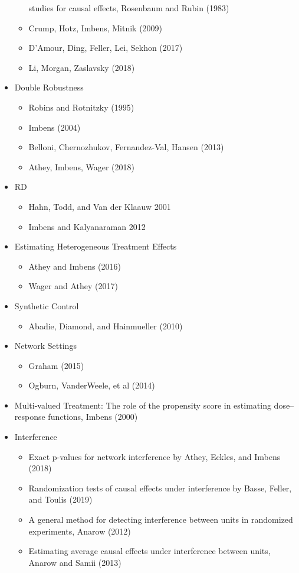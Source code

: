 \documentclass[12pt]{article}
\theoremstyle{plain}
\theoremstyle{definition}
\theoremstyle{remark}
\begin{document}
\begin{itemize}
\begin{itemize}
        studies for causal effects,
        Rosenbaum and Rubin (1983)
      \item
        Crump, Hotz, Imbens, Mitnik (2009)
      \item D'Amour, Ding, Feller, Lei, Sekhon (2017)
      \item Li, Morgan, Zaslavsky (2018)
    \end{itemize}
  \item Double Robustness
    \begin{itemize}
      \item Robins and Rotnitzky (1995)
      \item Imbens (2004)
      \item Belloni, Chernozhukov, Fernandez-Val, Hansen (2013)
      \item Athey, Imbens, Wager (2018)
    \end{itemize}
  \item RD
    \begin{itemize}
      \item Hahn, Todd, and Van der Klaauw 2001
      \item Imbens and Kalyanaraman 2012
    \end{itemize}
  \item Estimating Heterogeneous Treatment Effects
    \begin{itemize}
      \item Athey and Imbens (2016)
      \item Wager and Athey (2017)
    \end{itemize}
  \item Synthetic Control
    \begin{itemize}
      \item Abadie, Diamond, and Hainmueller (2010)
    \end{itemize}
  \item Network Settings
    \begin{itemize}
      \item Graham (2015)
      \item Ogburn, VanderWeele, et al (2014)
    \end{itemize}
  \item
    Multi-valued Treatment:
    The role of the propensity score in estimating dose–response
    functions,
    Imbens (2000)

  \item Interference
    \begin{itemize}
      \item Exact p-values for network interference by Athey, Eckles,
        and Imbens (2018)
      \item Randomization tests of causal effects under interference
        by Basse, Feller, and Toulis (2019)
      \item A general method for detecting interference between units in
        randomized experiments, Anarow (2012)
      \item Estimating average causal effects under interference between
        units, Anarow and Samii (2013)
    \end{itemize}


\end{itemize}
\end{document}
